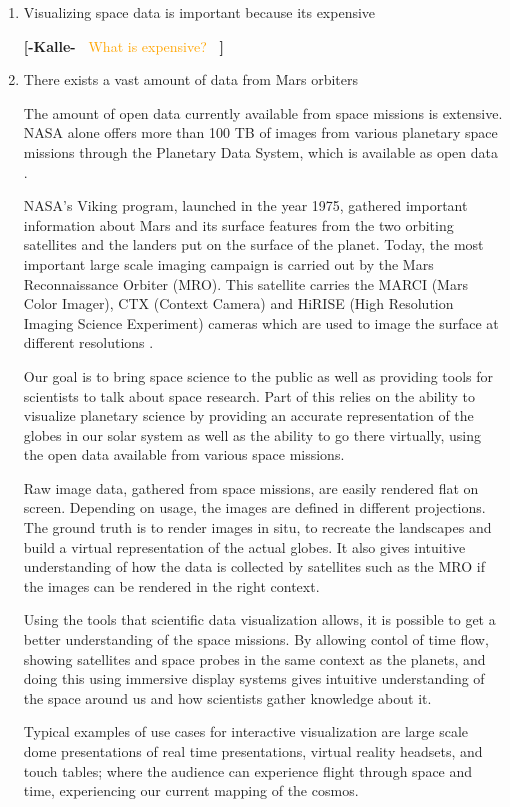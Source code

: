 \documentclass[journal]{vgtc}                %
\newcommand{\kallecomment}[1]{\textbf{[-Kalle-~}
    \textcolor{orange}{#1}
    \textbf{~]}}
\begin{document}
\begin{enumerate}
\item Visualizing space data is important because its expensive

\kallecomment{What is expensive?}

\item There exists a vast amount of data from Mars orbiters

The amount of open data currently available from space missions is extensive.
NASA alone offers more than 100 TB of images from various planetary space missions through the Planetary Data System, which is available as open data \cite{bigdata}.

NASA's Viking program, launched in the year 1975, gathered important information about Mars and its surface features from the two orbiting satellites and the landers put on the surface of the planet.
Today, the most important large scale imaging campaign is carried out by the Mars Reconnaissance Orbiter (MRO).
This satellite carries the MARCI (Mars Color Imager), CTX (Context Camera) and HiRISE (High Resolution Imaging Science Experiment) cameras which are used to image the surface at different resolutions \cite{mromission}.

Our goal is to bring space science to the public as well as providing tools for scientists to talk about space research.
Part of this relies on the ability to visualize planetary science by providing an accurate representation of the globes in our solar system as well as the ability to go there virtually, using the open data available from various space missions.

Raw image data, gathered from space missions, are easily rendered flat on screen. Depending on usage, the images are defined in different projections.
The ground truth is to render images in situ, to recreate the landscapes and build a virtual representation of the actual globes.
It also gives intuitive understanding of how the data is collected by satellites such as the MRO if the images can be rendered in the right context.

Using the tools that scientific data visualization allows, it is possible to get a better understanding of the space missions.
By allowing contol of time flow, showing satellites and space probes in the same context as the planets, and doing this using immersive display systems gives intuitive understanding of the space around us and how scientists gather knowledge about it.

Typical examples of use cases for interactive visualization are large scale dome presentations of real time presentations, virtual reality headsets, and touch tables; where the audience can experience flight through space and time, experiencing our current mapping of the cosmos.


\end{enumerate}
\end{document}
